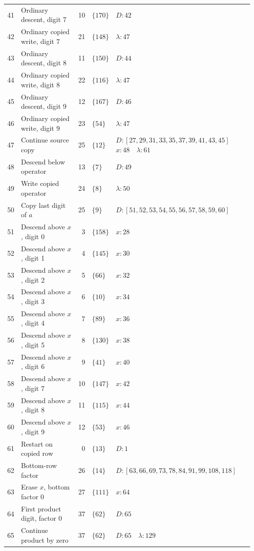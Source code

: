 \documentclass[11pt,a4paper]{article}
\newcommand{\blank}{\lambda}
\begin{document}
\begin{longtable}{r p{4.0cm} r l p{8.1cm}}
41 & Ordinary descent, digit 7 & 10 & $\{170\}$ & $D:42$ \\
42 & Ordinary copied write, digit 7 & 21 & $\{148\}$ & $\blank:47$ \\
43 & Ordinary descent, digit 8 & 11 & $\{150\}$ & $D:44$ \\
44 & Ordinary copied write, digit 8 & 22 & $\{116\}$ & $\blank:47$ \\
45 & Ordinary descent, digit 9 & 12 & $\{167\}$ & $D:46$ \\
46 & Ordinary copied write, digit 9 & 23 & $\{54\}$ & $\blank:47$ \\
47 & Continue source copy & 25 & $\{12\}$ & $D:[27,29,31,33,35,37,39,41,43,45]$\newline$x:48\quad \blank:61$ \\
48 & Descend below operator & 13 & $\{7\}$ & $D:49$ \\
49 & Write copied operator & 24 & $\{8\}$ & $\blank:50$ \\
50 & Copy last digit of $a$ & 25 & $\{9\}$ & $D:[51,52,53,54,55,56,57,58,59,60]$ \\
51 & Descend above $x$, digit 0 & 3 & $\{158\}$ & $x:28$ \\
52 & Descend above $x$, digit 1 & 4 & $\{145\}$ & $x:30$ \\
53 & Descend above $x$, digit 2 & 5 & $\{66\}$ & $x:32$ \\
54 & Descend above $x$, digit 3 & 6 & $\{10\}$ & $x:34$ \\
55 & Descend above $x$, digit 4 & 7 & $\{89\}$ & $x:36$ \\
56 & Descend above $x$, digit 5 & 8 & $\{130\}$ & $x:38$ \\
57 & Descend above $x$, digit 6 & 9 & $\{41\}$ & $x:40$ \\
58 & Descend above $x$, digit 7 & 10 & $\{147\}$ & $x:42$ \\
59 & Descend above $x$, digit 8 & 11 & $\{115\}$ & $x:44$ \\
60 & Descend above $x$, digit 9 & 12 & $\{53\}$ & $x:46$ \\
61 & Restart on copied row & 0 & $\{13\}$ & $D:1$ \\
62 & Bottom-row factor & 26 & $\{14\}$ & $D:[63,66,69,73,78,84,91,99,108,118]$ \\
63 & Erase $x$, bottom factor 0 & 27 & $\{111\}$ & $x:64$ \\
64 & First product digit, factor 0 & 37 & $\{62\}$ & $D:65$ \\
65 & Continue product by zero & 37 & $\{62\}$ & $D:65\quad \blank:129$ \\

\end{longtable}
\end{document}
